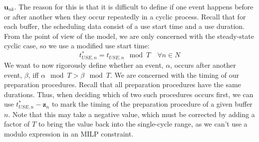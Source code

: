 $\boldsymbol{u}_{nk}$.
The reason for this is that it is difficult to define if one event happens
before or after another when they occur repeatedly in a cyclic process.
Recall that for each buffer, the scheduling data consist of a use start time
and a use duration.
From the point of view of the model, we are only concerned with the
steady-state cyclic case, so we use a modified use start time:
\begin{equation}
    t_{\mathit{USE},n}^{*} = t_{\mathit{USE},n} \mod T \quad \forall n
    \in N
\end{equation}
We want to now rigorously define whether an event, $\alpha$, occurs after
another event, $\beta$, iff $ \alpha \mod T > \beta \mod T $.
We are concerned with the timing of our preparation procedures.
Recall that all preparation procedures have the same durations.
Thus, when deciding which of two such procedures occurs first, we can use
$ t_{\mathit{USE},n}^{*} - \boldsymbol{z}_{n} $ to mark the timing of the
preparation procedure of a given buffer $n$.
Note that this may take a negative value, which must be corrected by adding a
factor of $T$ to bring the value back into the single-cycle range, as we
can't use a modulo expression in an MILP constraint.

